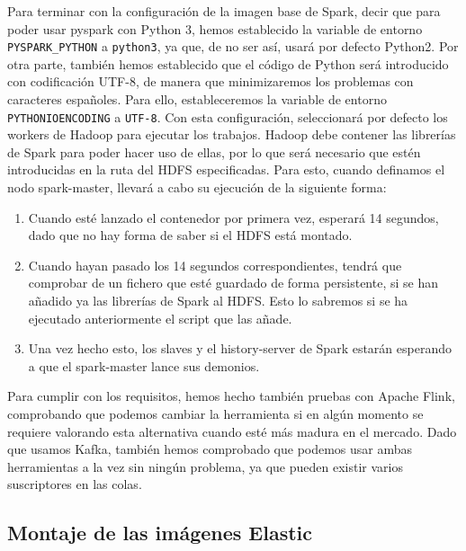 Para terminar con la configuración de la imagen base de Spark, decir que para poder usar pyspark con Python 3, hemos establecido la variable de entorno {\tt PYSPARK\_PYTHON} a {\tt python3}, ya que, de no ser así, usará por defecto Python2. Por otra parte, también hemos establecido que el código de Python será introducido con codificación UTF-8, de manera que minimizaremos los problemas con caracteres españoles. Para ello, estableceremos la variable de entorno {\tt PYTHONIOENCODING} a {\tt UTF-8}.
Con esta configuración, seleccionará por defecto los workers de Hadoop para ejecutar los trabajos. Hadoop debe contener las librerías de Spark para poder hacer uso de ellas, por lo que será necesario que estén introducidas en la ruta del HDFS especificadas. Para esto, cuando definamos el nodo spark-master, llevará a cabo su ejecución de la siguiente forma:
\begin{enumerate}
        \item Cuando esté lanzado el contenedor por primera vez, esperará 14 segundos, dado que no hay forma de saber si el HDFS está montado.
        \item Cuando hayan pasado los 14 segundos correspondientes, tendrá que comprobar de un fichero que esté guardado de forma persistente, si se han añadido ya las librerías de Spark al HDFS. Esto lo sabremos si se ha ejecutado anteriormente el script que las añade.
        \item Una vez hecho esto, los slaves y el history-server de Spark estarán esperando a que el spark-master lance sus demonios.
\end{enumerate}
Para cumplir con los requisitos, hemos hecho también pruebas con Apache Flink, comprobando que podemos cambiar la herramienta si en algún momento se requiere valorando esta alternativa cuando esté más madura en el mercado. Dado que usamos Kafka, también hemos comprobado que podemos usar ambas herramientas a la vez sin ningún problema, ya que pueden existir varios suscriptores en las colas.



\subsection{Montaje de las imágenes Elastic\label{montElastic}}

